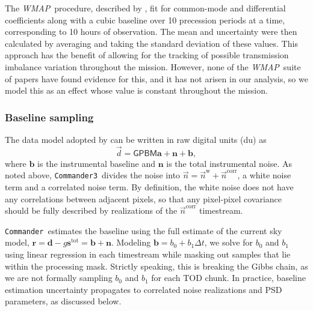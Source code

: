 \documentclass[twocolumn]{../../common/aa}
\def\WMAP{\emph{WMAP}}
\def\commander{\texttt{Commander}}
\def\commanderthree{\texttt{Commander3}}
\newcommand{\n}[0]{\vec{n}}
\newcommand{\data}{\vec d}
\begin{document}
The \WMAP\ procedure, described by \citet{jarosik2003a}, fit for common-mode and differential coefficients along with a cubic baseline over 10 precession periods at a time, corresponding to 10 hours of observation. The mean and uncertainty were then calculated by averaging and taking the standard deviation of these values. This approach has the benefit of allowing for the tracking of possible transmission imbalance variation throughout the mission. However, none of the \WMAP\ suite of papers have found evidence for this, and it has not arisen in our analysis, so we model this as an effect whose value is constant throughout the mission.

\subsubsection{Baseline sampling}
\label{ssec:baseline}

The data model adopted by \citet{hinshaw2003a} can be written in raw digital units (du) as
\begin{equation}
	\data = \mathsf{GPBM}\boldsymbol a+\boldsymbol n+\boldsymbol b,
\end{equation}
where $\boldsymbol b$ is the instrumental baseline and $\boldsymbol n$ is the
total instrumental noise. As noted above, \commanderthree\ divides
the noise into $\n=\n^\mathrm w+\n^\mathrm{corr}$, a white noise term and a
correlated noise term. By definition, the white noise does not have any
correlations between adjacent pixels, so that any pixel-pixel covariance should
be fully described by realizations of the $\n^\mathrm{corr}$ timestream.

\commander\ estimates the baseline using the full estimate of the current sky
model, $\boldsymbol r=\boldsymbol d-g\boldsymbol s^\mathrm{tot}=\boldsymbol
b+\boldsymbol n$. Modeling $\boldsymbol b=b_0+b_1\Delta t$, we solve for $b_0$
and $b_1$ using linear regression in each timestream while masking out samples
that lie within the processing mask. Strictly speaking, this is breaking the
Gibbs chain, as we are not formally sampling $b_0$ and $b_1$ for each TOD
chunk. In practice, baseline estimation uncertainty propagates to correlated
noise realizations and PSD parameters, as discussed below.
\end{document}
